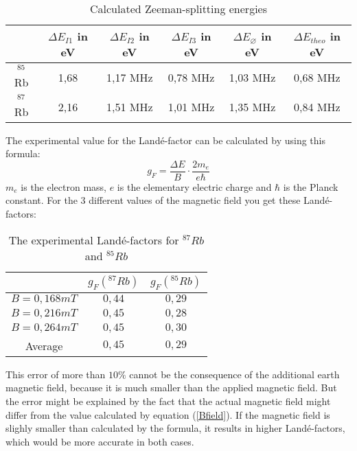 \begin{table}[h]
	\caption{Calculated Zeeman-splitting energies}
	\begin{tabular}{|c|c|c|c|c|c|}
	\hline
	 &  $\Delta E _{I1}$ in eV & $\Delta E _{I2}$ in eV& $\Delta E _{I3}$ in eV & $\Delta E _{\varnothing}$ in eV & $\Delta E _{theo}$ in eV\\ \hline
	 $^{85}$Rb & 1,68 & 1,17 MHz & 0,78 MHz& 1,03 MHz& 0,68 MHz\\ \hline
	 $^{87}$Rb & 2,16 & 1,51 MHz& 1,01 MHz& 1,35 MHz& 0,84 MHz\\ \hline
	\end{tabular}
\label{Zeeman2}
\end{table}
The experimental value for the Landé-factor can be calculated by using this formula:
\begin{equation}
 g_F=\frac{\Delta E}{B}\cdot \frac{2m_e}{e\hbar}
\end{equation}
$m_e$ is the electron mass, $e$ is the elementary electric charge and $\hbar$ is the Planck constant. 
For the 3 different values of the magnetic field you get these Landé-factors:
\begin{table}[h]
 \caption{The experimental Landé-factors for $^{87}Rb$ and $^{85}Rb$}
 \begin{tabular}{|c|c|c|}
  \hline
  & $g_F(^{87}Rb)$ & $g_F(^{85}Rb)$\\
  \hline $B = 0,168mT$& $0,44$& $0,29$ \\
  \hline $B = 0,216mT$& $0,45$ & $0,28$ \\
  \hline $B = 0,264mT$&$0,45$& $0,30$ \\
  \hline Average & $0,45$& $0,29$\\
  \hline
 \end{tabular}
\end{table}
This error of more than $10\%$ cannot be the consequence of the additional earth magnetic field, because it is much smaller than the applied magnetic field. But the error might be explained by the fact that the actual magnetic field might differ from the value calculated by equation (\ref{Bfield}). If the magnetic field is slighly smaller than calculated by the formula, it results in higher Landé-factors, which would be more accurate in both cases.

